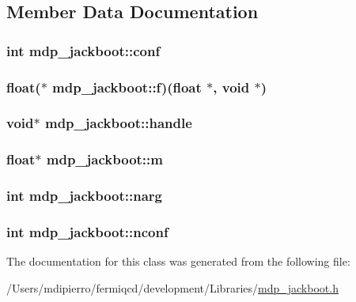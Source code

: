 \subsection{Member Data Documentation}
\hypertarget{classmdp__jackboot_ae84ce36555fb3089989232ca91d80e15}{
\subsubsection[{conf}]{\setlength{\rightskip}{0pt plus 5cm}int {\bf mdp\_\-jackboot::conf}}}
\label{classmdp__jackboot_ae84ce36555fb3089989232ca91d80e15}
\hypertarget{classmdp__jackboot_a5cb1c13dadb2d351c217925f2ba0748e}{
\subsubsection[{f}]{\setlength{\rightskip}{0pt plus 5cm}float($\ast$ {\bf mdp\_\-jackboot::f})(float $\ast$, void $\ast$)}}
\label{classmdp__jackboot_a5cb1c13dadb2d351c217925f2ba0748e}
\hypertarget{classmdp__jackboot_acb66568807fa4180f1c55c05d87e8cca}{
\subsubsection[{handle}]{\setlength{\rightskip}{0pt plus 5cm}void$\ast$ {\bf mdp\_\-jackboot::handle}}}
\label{classmdp__jackboot_acb66568807fa4180f1c55c05d87e8cca}
\hypertarget{classmdp__jackboot_a8f586ad6739906a0d3c8c1aba3a9886b}{
\subsubsection[{m}]{\setlength{\rightskip}{0pt plus 5cm}float$\ast$ {\bf mdp\_\-jackboot::m}}}
\label{classmdp__jackboot_a8f586ad6739906a0d3c8c1aba3a9886b}
\hypertarget{classmdp__jackboot_a455155a1460bacf19f95a3c1a3732714}{
\subsubsection[{narg}]{\setlength{\rightskip}{0pt plus 5cm}int {\bf mdp\_\-jackboot::narg}}}
\label{classmdp__jackboot_a455155a1460bacf19f95a3c1a3732714}
\hypertarget{classmdp__jackboot_a584457952e56b7deb3bea2f7b1f801d2}{
\subsubsection[{nconf}]{\setlength{\rightskip}{0pt plus 5cm}int {\bf mdp\_\-jackboot::nconf}}}
\label{classmdp__jackboot_a584457952e56b7deb3bea2f7b1f801d2}


The documentation for this class was generated from the following file:\begin{DoxyCompactItemize}
\item 
/Users/mdipierro/fermiqcd/development/Libraries/\hyperlink{mdp__jackboot_8h}{mdp\_\-jackboot.h}\end{DoxyCompactItemize}
